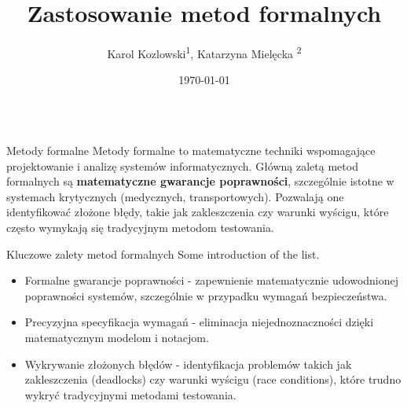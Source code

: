 \documentclass{purdue-poster}
\title{\Huge{Zastosowanie metod formalnych}}
\author{\Large{Karol Kozlowski\texorpdfstring{\textsuperscript{1}}{}, Katarzyna Mielęcka \texorpdfstring{\textsuperscript{2}}{}}}
\institute
{\large{Politechnika Warszawska},\\
Wydzial Elektryczny}
\date{\today}
\begin{document}
\begin{frame}{}
    \begin{columns}[c]
    \begin{column}{.48\linewidth}
    \begin{block}{\large Metody formalne}
        Metody formalne to matematyczne techniki wspomagające projektowanie i analizę 
        systemów informatycznych. Główną zaletą metod formalnych są \textbf{matematyczne gwarancje poprawności}, 
        szczególnie istotne w systemach krytycznych (medycznych, transportowych).
        Pozwalają one identyfikować złożone błędy, takie jak zakleszczenia czy warunki wyścigu, 
        które często wymykają się tradycyjnym metodom testowania. 

    \end{block}

    \begin{block}{Kluczowe zalety metod formalnych}
        Some introduction of the list.
        \begin{itemize}
            \item Formalne gwarancje poprawności - zapewnienie matematycznie udowodnionej poprawności systemów, szczególnie w przypadku wymagań bezpieczeństwa.
            \item Precyzyjna specyfikacja wymagań - eliminacja niejednoznaczności dzięki matematycznym modelom i notacjom.
            \item Wykrywanie złożonych błędów - identyfikacja problemów takich jak zakleszczenia (deadlocks) czy warunki wyścigu (race conditions), które trudno wykryć tradycyjnymi metodami testowania.
        \end{itemize}
    \end{block}



\end{column}
\end{columns}
\end{frame}
\end{document}
